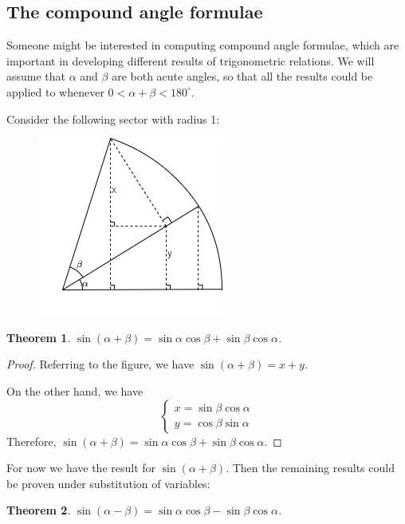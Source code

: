\documentclass[12pt]{article}
\newtheorem*{theorem}{Theorem}
\begin{document}
    \subsection{The compound angle formulae}

    Someone might be interested in computing compound angle formulae, which are important in developing different results of trigonometric relations. We will assume that $\alpha$ and $\beta$ are both acute angles, so that all the results could be applied to whenever $0<\alpha+\beta<180^\circ$.

    Consider the following sector with radius 1:
    \begin{figure}[H]
        \centering
        \includegraphics[scale=0.8]{ab.png}
    \end{figure}

    \begin{theorem}
        $\sin(\alpha+\beta)=\sin{\alpha}\cos{\beta}+\sin{\beta}\cos{\alpha}$.
    \end{theorem}

    \begin{proof}
        Referring to the figure, we have $\sin(\alpha+\beta)=x+y$.
        
        On the other hand, we have $$\begin{cases}
            x=\sin{\beta}\cos{\alpha}\\y=\cos{\beta}\sin{\alpha}
        \end{cases}$$ Therefore, $\sin(\alpha+\beta)=\sin{\alpha}\cos{\beta}+\sin{\beta}\cos{\alpha}$.
    \end{proof}

    For now we have the result for $\sin(\alpha+\beta)$. Then the remaining results could be proven under substitution of variables:
    
    \begin{theorem}
        $\sin(\alpha-\beta)=\sin{\alpha}\cos{\beta}-\sin{\beta}\cos{\alpha}$.
    \end{theorem}
\end{document}
